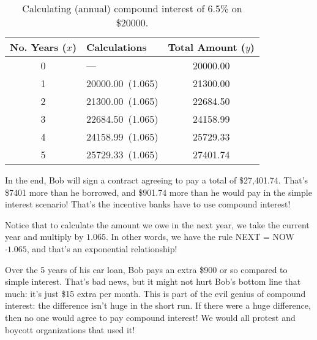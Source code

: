 \begin{table}[!htbp]
\centering
\begin{tabular}{clc}
No. Years ($x$) & Calculations & Total Amount ($y$)\\\hline
0 & --- & 20000.00\\
1 & 20000.00~(1.065) & 21300.00\\
2 & 21300.00~(1.065) & 22684.50\\
3 & 22684.50~(1.065) & 24158.99\\
4 & 24158.99~(1.065) & 25729.33\\
5 & 25729.33~(1.065) & 27401.74\\
\end{tabular}
\caption{Calculating (annual) compound interest of 6.5\% on \$20000.}
\label{table:bobcompound}
\end{table}

In the end, Bob will sign a contract agreeing to pay a total of \$27,401.74. That's \$7401 more than he borrowed, and \$901.74 more than he would pay in the simple interest scenario! That's the incentive banks have to use compound interest!

Notice that to calculate the amount we owe in the next year, we take the current year and multiply by $1.065$. In other words, we have the rule NEXT = NOW $\cdot 1.065$, and that's an exponential relationship!


Over the 5 years of his car loan, Bob pays an extra \$900 or so compared to simple interest. That's bad news, but it might not hurt Bob's bottom line that much: it's just \$15 extra per month. This is part of the evil genius of compound interest: the difference isn't huge in the short run. If there were a huge difference, then no one would agree to pay compound interest! We would all protest and boycott organizations that used it!

